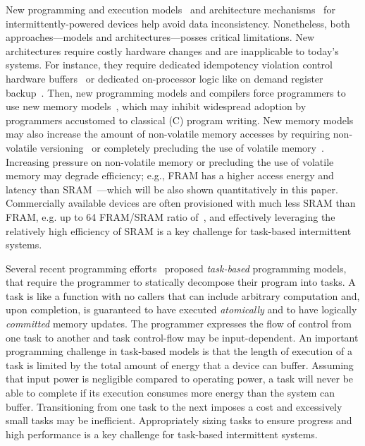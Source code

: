 
New programming and execution models~\cite{dino,ratchet,chain,alpaca} and
architecture mechanisms~\cite{hicks_isca_2017,idetic,nvp} for intermittently-powered devices help avoid data inconsistency. Nonetheless, both approaches---models and architectures---posses critical limitations. New architectures require costly hardware changes and are inapplicable to today's systems. For instance, they require dedicated idempotency violation control hardware buffers~\cite[Fig. 3]{hicks_isca_2017} or dedicated on-processor logic like on demand register backup~\cite[Fig. 9]{nvp}. Then, new programming models and compilers force programmers to use new memory models~\cite{chain,ratchet}, which may inhibit widespread adoption by programmers accustomed to classical (C) program writing. New memory models may also increase the amount of non-volatile memory accesses by requiring non-volatile versioning~\cite{chain} or completely precluding the use of volatile memory~\cite{ratchet}. Increasing pressure on non-volatile memory or precluding the use of volatile memory may degrade efficiency; e.g., FRAM has a higher access energy and latency than SRAM~\cite[Fig. 4]{nvp}---which will be also shown quantitatively in this paper. Commercially available devices are often provisioned with much less SRAM than FRAM, e.g. up to 64 FRAM/SRAM ratio of~\cite{wolverine}, and effectively leveraging the relatively high efficiency of SRAM is a key challenge for task-based intermittent systems.


Several recent programming efforts~\cite{alpaca,chain} proposed {\em
task-based} programming models, that require the programmer to statically
decompose their program into tasks. A task is like a function with no callers
that can include arbitrary computation and, upon completion, is guaranteed to
have executed {\em atomically} and to have logically {\em committed} memory
updates. The programmer expresses the flow of control from one task to another
and task control-flow may be input-dependent. An important programming
challenge in task-based models is that the length of execution of a task is
limited by the total amount of energy that a device can buffer. Assuming that
input power is negligible compared to operating power, a task will never be
able to complete if its execution consumes more energy than the system can
buffer. Transitioning from one task to the next imposes a cost and excessively
small tasks may be inefficient. Appropriately sizing tasks to ensure progress
and high performance is a key challenge for task-based intermittent systems. 

